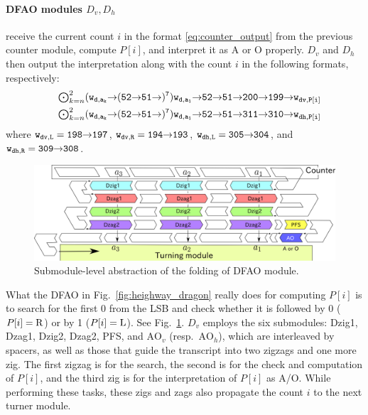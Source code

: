 \documentclass[runningheads]{llncs}
\newcommand{\east}{{\ensuremath \to}}
\begin{document}
\paragraph{DFAO modules $D_v, D_h$} receive the current count $i$ in the format \eqref{eq:counter_output} from the previous counter module, compute $P[i]$, and interpret it as A or O properly. 
$D_v$ and $D_h$ then output the interpretation along with the count $i$ in the following formats, respectively: 
\begin{eqnarray}
& & {\tt \mbox{$\bigodot_{k=n}^2$} (w_{d, a_k} \east (52 \east 51 \east)^7) w_{d, a_1} \east 52 \east 51 \east 200 \east 199 \east w_{dv, P[i]}} \label{eq:Dv_output}\\
& & {\tt \mbox{$\bigodot_{k=n}^2$} (w_{d, a_k} \east (52 \east 51 \east)^7) w_{d, a_1} \east 52 \east 51 \east 311 \east 310 \east w_{dh, P[i]}} \label{eq:Dh_output}
\end{eqnarray}
where ${\tt w_{dv, L} = 198 \east 197}$, ${\tt w_{dv, R} = 194 \east 193}$, ${\tt w_{dh, L} = 305 \east 304}$, and ${\tt w_{dh, R} = 309 \east 308}$.

\begin{figure}[tb]
\includegraphics[width=\linewidth]{pics/abst_DFAO.png}
\caption{Submodule-level abstraction of the folding of DFAO module.}
\label{fig:abst_dfao}
\end{figure}

What the DFAO in Fig.~\ref{fig:heighway_dragon} really does for computing $P[i]$ is to search for the first 0 from the LSB and check whether it is followed by 0 ($P[i] = {\rm R}$) or by 1 ($P[i] = {\rm L}$). 
See Fig.~\ref{fig:abst_dfao}. 
$D_v$ employs the six submodules: Dzig1, Dzag1, Dzig2, Dzag2, PFS, and $\mathrm{AO}_v$ (resp.~$\mathrm{AO}_h$), which are interleaved by spacers, as well as those that guide the transcript into two zigzags and one more zig. 
The first zigzag is for the search, the second is for the check and computation of $P[i]$, and the third zig is for the interpretation of $P[i]$ as A/O. 
While performing these tasks, these zigs and zags also propagate the count $i$ to the next turner module. 
\end{document}
